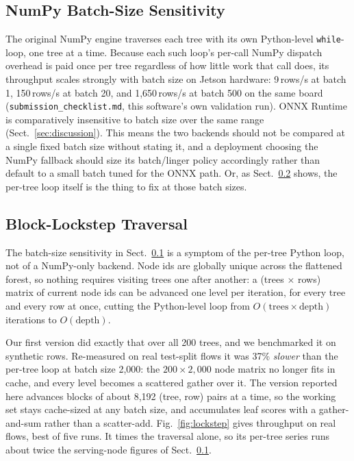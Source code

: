 \documentclass[runningheads]{llncs}
\begin{document}
\subsection{NumPy Batch-Size Sensitivity}
\label{sec:batch-sensitivity}

The original NumPy engine traverses each tree with its own Python-level \texttt{while}-loop, one tree at a time. Because each such loop's per-call NumPy dispatch overhead is paid once per tree regardless of how little work that call does, its throughput scales strongly with batch size on Jetson hardware: 9\,rows/s at batch 1, 150\,rows/s at batch 20, and 1{,}650\,rows/s at batch 500 on the same board (\texttt{submission\_checklist.md}, this software's own validation run). ONNX Runtime is comparatively insensitive to batch size over the same range (Sect.~\ref{sec:discussion}). This means the two backends should not be compared at a single fixed batch size without stating it, and a deployment choosing the NumPy fallback should size its batch/linger policy accordingly rather than default to a small batch tuned for the ONNX path. Or, as Sect.~\ref{sec:lockstep} shows, the per-tree loop itself is the thing to fix at those batch sizes.

\subsection{Block-Lockstep Traversal}
\label{sec:lockstep}

The batch-size sensitivity in Sect.~\ref{sec:batch-sensitivity} is a symptom of the per-tree Python loop, not of a NumPy-only backend. Node ids are globally unique across the flattened forest, so nothing requires visiting trees one after another: a (trees $\times$ rows) matrix of current node ids can be advanced one level per iteration, for every tree and every row at once, cutting the Python-level loop from $O(\text{trees} \times \text{depth})$ iterations to $O(\text{depth})$.

Our first version did exactly that over all 200 trees, and we benchmarked it on synthetic rows. Re-measured on real test-split flows it was 37\% \emph{slower} than the per-tree loop at batch size 2{,}000: the $200 \times 2{,}000$ node matrix no longer fits in cache, and every level becomes a scattered gather over it. The version reported here advances blocks of about 8{,}192 (tree, row) pairs at a time, so the working set stays cache-sized at any batch size, and accumulates leaf scores with a gather-and-sum rather than a scatter-add. Fig.~\ref{fig:lockstep} gives throughput on real flows, best of five runs. It times the traversal alone, so its per-tree series runs about twice the serving-node figures of Sect.~\ref{sec:batch-sensitivity}.
\end{document}
